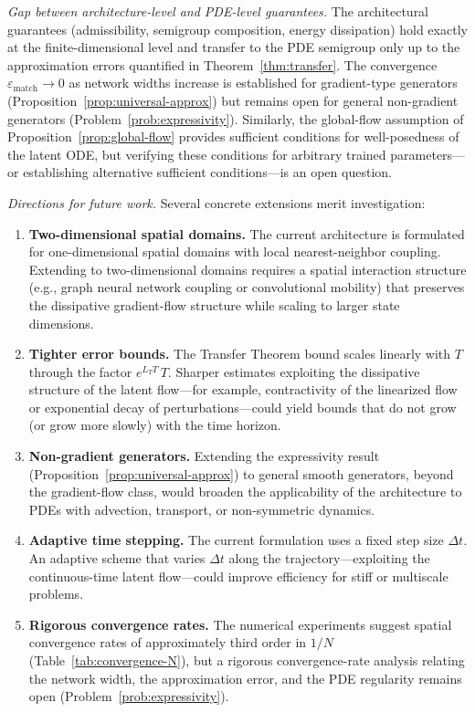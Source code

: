 \documentclass[11pt]{article}
\begin{document}
\emph{Gap between architecture-level and PDE-level guarantees.}
The architectural guarantees (admissibility, semigroup composition, energy dissipation) hold exactly at the finite-dimensional level and transfer to the PDE semigroup only up to the approximation errors quantified in Theorem~\ref{thm:transfer}. The convergence $\varepsilon_{\mathrm{match}}\to 0$ as network widths increase is established for gradient-type generators (Proposition~\ref{prop:universal-approx}) but remains open for general non-gradient generators (Problem~\ref{prob:expressivity}). Similarly, the global-flow assumption of Proposition~\ref{prop:global-flow} provides sufficient conditions for well-posedness of the latent ODE, but verifying these conditions for arbitrary trained parameters---or establishing alternative sufficient conditions---is an open question.

\emph{Directions for future work.}
Several concrete extensions merit investigation:
\begin{enumerate}[label=(\arabic*)]
    \item \textbf{Two-dimensional spatial domains.} The current architecture is formulated for one-dimensional spatial domains with local nearest-neighbor coupling. Extending to two-dimensional domains requires a spatial interaction structure (e.g., graph neural network coupling or convolutional mobility) that preserves the dissipative gradient-flow structure while scaling to larger state dimensions.
    \item \textbf{Tighter error bounds.} The Transfer Theorem bound scales linearly with $T$ through the factor $e^{L_TT}\,T$. Sharper estimates exploiting the dissipative structure of the latent flow---for example, contractivity of the linearized flow or exponential decay of perturbations---could yield bounds that do not grow (or grow more slowly) with the time horizon.
    \item \textbf{Non-gradient generators.} Extending the expressivity result (Proposition~\ref{prop:universal-approx}) to general smooth generators, beyond the gradient-flow class, would broaden the applicability of the architecture to PDEs with advection, transport, or non-symmetric dynamics.
    \item \textbf{Adaptive time stepping.} The current formulation uses a fixed step size $\Delta t$. An adaptive scheme that varies $\Delta t$ along the trajectory---exploiting the continuous-time latent flow---could improve efficiency for stiff or multiscale problems.
    \item \textbf{Rigorous convergence rates.} The numerical experiments suggest spatial convergence rates of approximately third order in $1/N$ (Table~\ref{tab:convergence-N}), but a rigorous convergence-rate analysis relating the network width, the approximation error, and the PDE regularity remains open (Problem~\ref{prob:expressivity}).
\end{enumerate}
\end{document}
